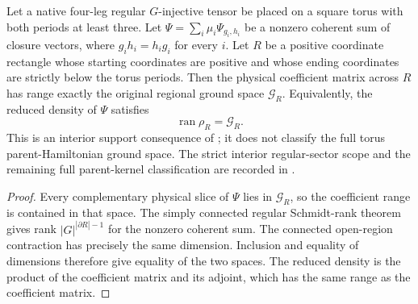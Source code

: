 \begin{lemma}%
    \label{thm:peps_regular_torus_sector_interior_support}
    \leanok
    Let a native four-leg regular $G$-injective tensor be placed on a
    square torus with both periods at least three. Let
    $\Psi=\sum_i\mu_i\Psi_{g_i,h_i}$ be a nonzero coherent sum of
    closure vectors, where $g_i h_i=h_i g_i$ for every $i$.
    Let $R$ be a positive coordinate rectangle whose starting
    coordinates are positive and whose ending coordinates are
    strictly below the torus periods. Then the physical coefficient
    matrix across $R$ has range exactly the original regional
    ground space $\mathcal G_R$. Equivalently, the reduced
    density of $\Psi$ satisfies
    \[
        \operatorname{ran}\rho_R=\mathcal G_R.
    \]
    This is an interior support consequence of
    \cite[Theorem~5.5 and Corollary~6.10]{Schuch2010PEPS}; it does
    not classify the full torus parent-Hamiltonian ground space.
    The strict interior regular-sector scope and the remaining full parent-kernel classification are recorded in
    \cite{gap:rmp_peps_quantum_double_g_isometry}.
\end{lemma}

\begin{proof}\leanok
    Every complementary physical slice of $\Psi$ lies in
    $\mathcal G_R$, so the coefficient range is contained in that
    space. The simply connected regular Schmidt-rank theorem gives
    rank $|G|^{|\partial R|-1}$ for the nonzero coherent sum.
    The connected open-region contraction has precisely the same
    dimension. Inclusion and equality of dimensions therefore give
    equality of the two spaces. The reduced density is the product
    of the coefficient matrix and its adjoint, which has the same
    range as the coefficient matrix.
\end{proof}
